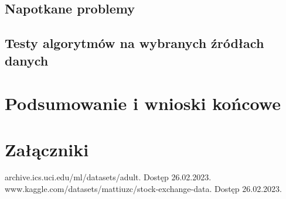 \documentclass[12pt,twoside]{article}
\begin{document}
\subsection{Napotkane problemy}
\subsection{Testy algorytmów na wybranych źródłach danych}
\clearpage


\section{Podsumowanie i wnioski końcowe}

\clearpage


\section*{Załączniki}


\clearpage



\begin{thebibliography}{4}
     archive.ics.uci.edu/ml/datasets/adult. Dostęp 26.02.2023.
     www.kaggle.com/datasets/mattiuzc/stock-exchange-data. Dostęp 26.02.2023.
\end{thebibliography}

\clearpage


\makesummary
\end{document}
